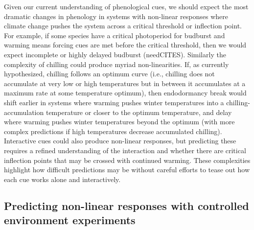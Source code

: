 \documentclass[11pt,letter]{article}
\begin{document}
Given our current understanding of phenological cues, we should expect the most dramatic changes in phenology in systems with non-linear responses where climate change pushes the system across a critical threshold or inflection point. For example, if some species have a critical photoperiod for budburst and warming means forcing cues are met before the critical threshold, then we would expect incomplete or highly delayed budburst (needCITES). Similarly the complexity of chilling could produce myriad non-linearities. If, as currently hypothesized, chilling follows an optimum curve (i.e., chilling does not accumulate at very low or high temperatures but in between it accumulates at a maximum rate at some temperature optimum), then endodormancy break would shift earlier in systems where warming pushes winter temperatures into a chilling-accumulation temperature or closer to the optimum temperature, and delay where warming pushes winter temperatures beyond the optimum (with more complex predictions if high temperatures decrease accumulated chilling). Interactive cues could also produce non-linear responses, but predicting these requires a refined understanding of the interaction and whether there are critical inflection points that may be crossed with continued warming. These complexities highlight how difficult predictions may be without careful efforts to tease out how each cue works alone and interactively. 

\subsection{Predicting non-linear responses with controlled environment experiments} %
\end{document}
